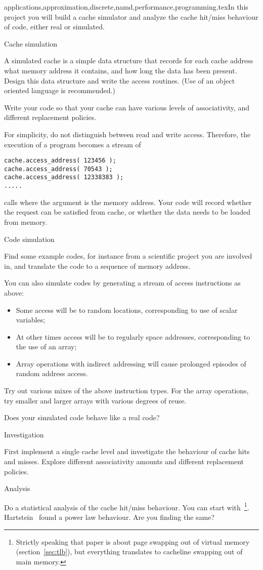 {applications,approximation,discrete,namd,performance,programming}.texIn this project you will build a cache simulator and analyze the cache
hit/miss behaviour of code, either real or simulated.

 {Cache simulation}

A simulated cache is a simple data structure that records for each
cache address what memory address it contains, and how long the data
has been present. Design this data structure and write the access
routines. (Use of an object oriented language is recommended.)

Write your code so that your cache can have various levels of
associativity, and different replacement policies.

For simplicity, do not distinguish between read and write
access. Therefore, the execution of a program becomes a stream of
\begin{verbatim}
cache.access_address( 123456 );
cache.access_address( 70543 );
cache.access_address( 12338383 );
.....
\end{verbatim}
calls where the argument is the memory address. Your code will record
whether the request can be satisfied from cache, or whether the data
needs to be loaded from memory.

 {Code simulation}

Find some example codes, for instance from a scientific project you
are involved in, and translate the code to a sequence of memory
address. 

You can also simulate codes by generating a stream of access
instructions as above:
\begin{itemize}
\item Some access will be to random locations, corresponding to use of
  scalar variables;
\item At other times access will be to regularly space addresses,
  corresponding to the use of an array;
\item Array operations with indirect addressing will cause prolonged
  episodes of random address access.
\end{itemize}
Try out various mixes of the above instruction types. For the array
operations, try smaller and larger arrays with various degrees of
reuse.

Does your simulated code behave like a real code?

 {Investigation}

First implement a single cache level and investigate the behaviour of
cache hits and misses. Explore different associativity amounts and
different replacement policies.

 {Analysis}

Do a statistical analysis of the cache hit/miss behaviour. You can
start with~\cite{Rao:1978:cache}\footnote{Strictly speaking that paper
  is about page swapping out of virtual memory
  (section~\ref{sec:tlb}), but everything translates to cacheline
  swapping out of main memory.}. Hartstein~\cite{Hartstein:cache-sqrt}
found a power law behaviour. Are you finding the same?
